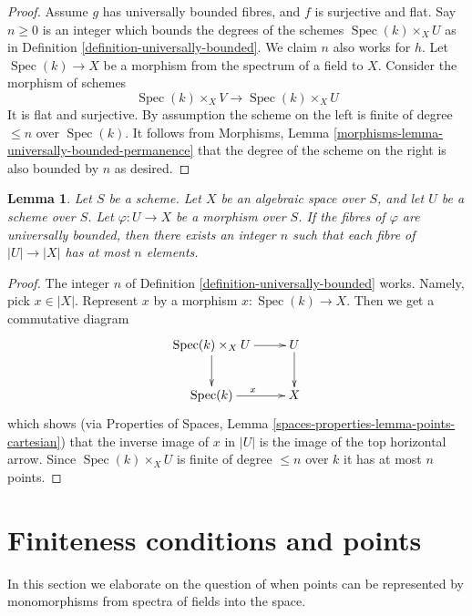 \documentclass{stacks-project}
\theoremstyle{plain}
\newtheorem{lemma}[subsection]{Lemma}
\theoremstyle{definition}
\theoremstyle{remark}
\numberwithin{equation}{subsection}
\def\Spec{\mathop{\mathrm{Spec}}}
\begin{document}
\begin{proof}
Assume $g$ has universally bounded fibres, and $f$ is surjective and flat.
Say $n \geq 0$ is an integer which bounds the degrees of the schemes
$\Spec(k) \times_X U$ as in
Definition \ref{definition-universally-bounded}.
We claim $n$ also works for $h$.
Let $\Spec(k) \to X$ be a morphism from the spectrum of a
field to $X$. Consider the morphism of schemes
$$
\Spec(k) \times_X V \longrightarrow \Spec(k) \times_X U
$$
It is flat and surjective. By assumption the scheme
on the left is finite of degree $\leq n$ over $\Spec(k)$.
It follows from
Morphisms, Lemma \ref{morphisms-lemma-universally-bounded-permanence}
that the degree of the scheme on the right is also bounded by $n$
as desired.
\end{proof}

\begin{lemma}
\label{lemma-universally-bounded-finite-fibres}
Let $S$ be a scheme.
Let $X$ be an algebraic space over $S$, and let $U$ be a scheme over $S$.
Let $\varphi : U \to X$ be a morphism over $S$.
If the fibres of $\varphi$ are universally bounded, then there exists an
integer $n$ such that each fibre of $|U| \to |X|$ has at most
$n$ elements.
\end{lemma}

\begin{proof}
The integer $n$ of Definition \ref{definition-universally-bounded} works.
Namely, pick $x \in |X|$. Represent $x$ by a morphism
$x : \Spec(k) \to X$. Then we get a commutative diagram
$$
\xymatrix{
\Spec(k) \times_X U \ar[r] \ar[d] & U \ar[d] \\
\Spec(k) \ar[r]^x & X
}
$$
which shows (via
Properties of Spaces,
Lemma \ref{spaces-properties-lemma-points-cartesian})
that the inverse image of $x$ in $|U|$ is the image of
the top horizontal arrow. Since $\Spec(k) \times_X U$ is finite
of degree $\leq n$ over $k$ it has at most $n$ points.
\end{proof}








\section{Finiteness conditions and points}
\label{section-points-monomorphisms}

\noindent
In this section we elaborate on the question of when points can be represented
by monomorphisms from spectra of fields into the space.
\end{document}
